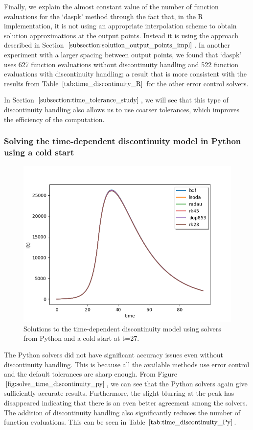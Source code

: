 Finally, we explain the almost constant value of the number of function evaluations for the `daspk' method through the fact that, in the R implementation, it is not using an appropriate interpolation scheme to obtain solution approximations at the output points. Instead it is using the approach described in Section $\ref{subsection:solution_output_points_impl}$. In another experiment with a larger spacing between output points, we found that `daspk' uses 627 function evaluations without discontinuity handling and 522 function evaluations with discontinuity handling; a result that is more consistent with the results from Table $\ref{tab:time_discontinuity_R}$ for the other error control solvers.

In Section $\ref{subsection:time_tolerance_study}$, we will see that this type of discontinuity handling also allows us to use coarser tolerances, which improves the efficiency of the computation.

\subsubsection{Solving the time-dependent discontinuity model in Python using a cold start} 
\begin{figure}[H]
\centering
\includegraphics[width=0.7\linewidth]{./figures/solve_time_discontinuity_py}
\caption{Solutions to the time-dependent discontinuity model using solvers from Python and a cold start at t=27.}
\label{fig:solve_time_discontinuity_py}
\end{figure}
The Python solvers did not have significant accuracy issues even without discontinuity handling. This is because all the available methods use error control and the default tolerances are sharp enough. From Figure $\ref{fig:solve_time_discontinuity_py}$, we can see that the Python solvers again give sufficiently accurate results. Furthermore, the slight blurring at the peak has disappeared indicating that there is an even better agreement among the solvers. The addition of discontinuity handling also significantly reduces the number of function evaluations. This can be seen in Table $\ref{tab:time_discontinuity_Py}$.

